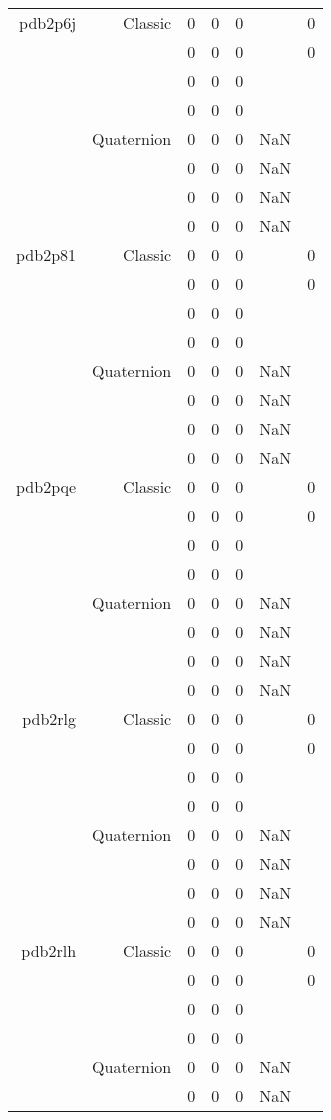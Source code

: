 \begin{xltabular}{\textwidth}{r|rcccSc}
pdb2p6j & Classic & 0 & 0 & 0 & & 0 \\
& & 0 & 0 & 0 & & 0 \\
& & 0 & 0 & 0 & & \\
& & 0 & 0 & 0 & & \\
& Quaternion & 0 & 0 & 0 & NaN & \\
& & 0 & 0 & 0 & NaN & \\
& & 0 & 0 & 0 & NaN & \\
& & 0 & 0 & 0 & NaN & \\ \addlinespace
pdb2p81 & Classic & 0 & 0 & 0 & & 0 \\
& & 0 & 0 & 0 & & 0 \\
& & 0 & 0 & 0 & & \\
& & 0 & 0 & 0 & & \\
& Quaternion & 0 & 0 & 0 & NaN & \\
& & 0 & 0 & 0 & NaN & \\
& & 0 & 0 & 0 & NaN & \\
& & 0 & 0 & 0 & NaN & \\ \addlinespace
pdb2pqe & Classic & 0 & 0 & 0 & & 0 \\
& & 0 & 0 & 0 & & 0 \\
& & 0 & 0 & 0 & & \\
& & 0 & 0 & 0 & & \\
& Quaternion & 0 & 0 & 0 & NaN & \\
& & 0 & 0 & 0 & NaN & \\
& & 0 & 0 & 0 & NaN & \\
& & 0 & 0 & 0 & NaN & \\ \addlinespace
pdb2rlg & Classic & 0 & 0 & 0 & & 0 \\
& & 0 & 0 & 0 & & 0 \\
& & 0 & 0 & 0 & & \\
& & 0 & 0 & 0 & & \\
& Quaternion & 0 & 0 & 0 & NaN & \\
& & 0 & 0 & 0 & NaN & \\
& & 0 & 0 & 0 & NaN & \\
& & 0 & 0 & 0 & NaN & \\ \addlinespace
pdb2rlh & Classic & 0 & 0 & 0 & & 0 \\
& & 0 & 0 & 0 & & 0 \\
& & 0 & 0 & 0 & & \\
& & 0 & 0 & 0 & & \\
& Quaternion & 0 & 0 & 0 & NaN & \\
& & 0 & 0 & 0 & NaN & \\

\end{xltabular}
